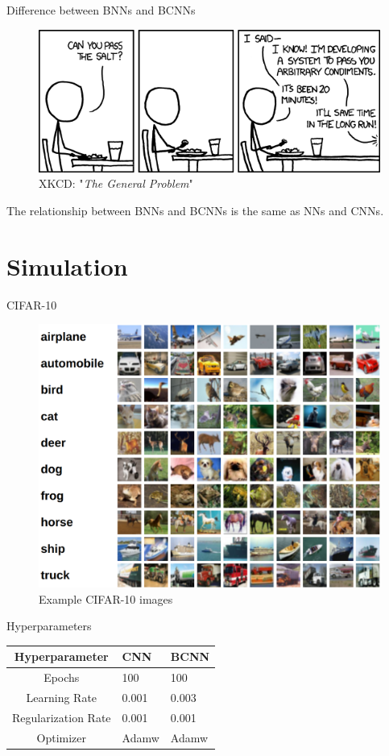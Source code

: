 \documentclass{beamer}
\begin{document}
\begin{frame}{Difference between BNNs and BCNNs}
	\begin{figure}
		\includegraphics[width=.75\textwidth]{../Images/the_general_problem.png}
		\caption{ XKCD: "\textit{The General Problem}" \cite{xkcd-general-problem}}
	\end{figure}
		The relationship between BNNs and BCNNs is the same as NNs and CNNs.
\end{frame}


\section{Simulation}

\begin{frame}{CIFAR-10}
	\begin{figure}
		\includegraphics[width=.65\textwidth]{../Images/cifar-10.png}
		\caption{Example CIFAR-10 images \cite{cifar10}}
	\end{figure}
\end{frame}

\begin{frame}{Hyperparameters}
	\centering
	\begin{tabular}{|c||p{3cm}|p{3cm}|} %
		\hline
		\textbf{Hyperparameter} & \textbf{CNN} & \textbf{BCNN} \\ [0.5ex] 
		\hline\hline
		Epochs & 100 & 100\\
		\hline
		Learning Rate & 0.001  & 0.003  \\
		\hline
		Regularization Rate& 0.001 & 0.001 \\
		\hline
		Optimizer & Adamw  & Adamw  \\
		\hline
	\end{tabular}
\end{frame}
\end{document}
